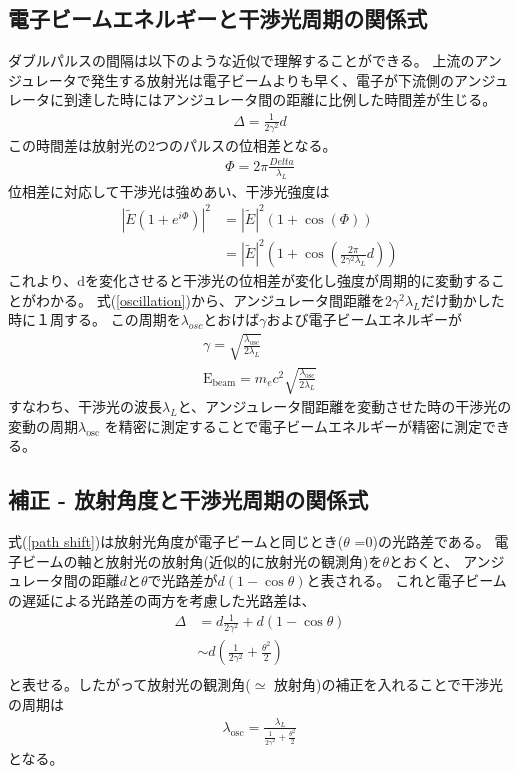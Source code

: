 \documentclass[a4paper,11pt,uplatex]{jsbook}
\begin{document}
\subsection{電子ビームエネルギーと干渉光周期の関係式}
ダブルパルスの間隔は以下のような近似で理解することができる。
上流のアンジュレータで発生する放射光は電子ビームよりも早く、電子が下流側のアンジュレータに到達した時にはアンジュレータ間の距離に比例した時間差が生じる。
\begin{eqnarray}
  \Delta = \frac{1}{2\gamma^2}d \label{path shift}
\end{eqnarray}
この時間差は放射光の2つのパルスの位相差となる。
\begin{eqnarray}
  \Phi = 2\pi \frac{Delta}{\lambda_L}
\end{eqnarray}
位相差に対応して干渉光は強めあい、干渉光強度は
\begin{eqnarray}
  |\tilde{E} \left( 1+ e^{i\Phi}\right)|^2 
&= |\tilde{E}|^2 \left( 1 + \cos(\Phi) \right)\\
&= |\tilde{E}|^2 \left( 1 + \cos(\frac{2\pi}{2\gamma^2\lambda_L}d) \right) 
  \label{oscillation}
\end{eqnarray}
これより、dを変化させると干渉光の位相差が変化し強度が周期的に変動することがわかる。
式(\ref{oscillation})から、アンジュレータ間距離を$2\gamma^2\lambda_L$だけ動かした時に１周する。
この周期を$\lambda_{osc}$とおけば$\gamma$および電子ビームエネルギーが
\begin{eqnarray}
  \gamma = \sqrt{\frac{\lambda_{\text{osc}}}{2\lambda_L}}\\
  \text{E}_\text{beam} =m_e c^2  \sqrt{\frac{\lambda_{\text{osc}}}{2\lambda_L}} \label{zero order energy formula}
\end{eqnarray}
すなわち、干渉光の波長$\lambda_L$と、アンジュレータ間距離を変動させた時の干渉光の変動の周期$\lambda_{\text{osc}}$
を精密に測定することで電子ビームエネルギーが精密に測定できる。

\subsection{補正 - 放射角度と干渉光周期の関係式}
式(\ref*{path shift})は放射光角度が電子ビームと同じとき($\theta$ =0)の光路差である。
電子ビームの軸と放射光の放射角(近似的に放射光の観測角)を$\theta$とおくと、
アンジュレータ間の距離$d$と$\theta$で光路差が$d(1-\cos{\theta})$と表される。
これと電子ビームの遅延による光路差の両方を考慮した光路差は、
\begin{eqnarray}
  \Delta &= d\frac{1}{2\gamma^2} + d(1 - \cos{\theta}) \\
        &\sim d(\frac{1}{2\gamma^2} + \frac{\theta^2}{2})\\
\end{eqnarray}
と表せる。したがって放射光の観測角($\simeq$ 放射角)の補正を入れることで干渉光の周期は
\begin{eqnarray}
  \lambda_{\text{osc}} = \frac{\lambda_L}{\frac{1}{2\gamma^2} + \frac{\theta^2}{2}}
\end{eqnarray}
となる。
\end{document}
